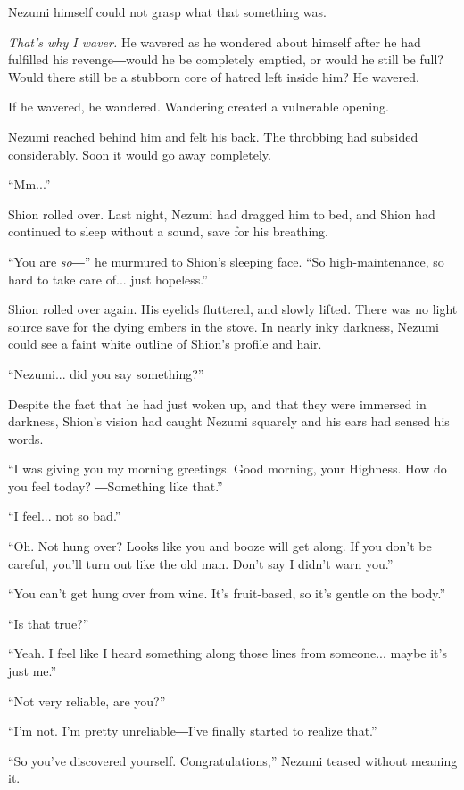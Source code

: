 Nezumi himself could not grasp what that something was.

\emph{That's why I waver.} He wavered as he wondered about himself after he had
fulfilled his revenge―would he be completely emptied, or would he still
be full? Would there still be a stubborn core of hatred left inside him?
He wavered.

If he wavered, he wandered. Wandering created a vulnerable opening.

Nezumi reached behind him and felt his back. The throbbing had subsided
considerably. Soon it would go away completely.

``Mm...''

Shion rolled over. Last night, Nezumi had dragged him to bed, and Shion
had continued to sleep without a sound, save for his breathing.

``You are \emph{so}―'' he murmured to Shion's sleeping face. ``So
high-maintenance, so hard to take care of... just hopeless.''

Shion rolled over again. His eyelids fluttered, and slowly lifted. There
was no light source save for the dying embers in the stove. In nearly
inky darkness, Nezumi could see a faint white outline of Shion's profile
and hair.

``Nezumi... did you say something?''

Despite the fact that he had just woken up, and that they were immersed
in darkness, Shion's vision had caught Nezumi squarely and his ears had
sensed his words.

``I was giving you my morning greetings. Good morning, your Highness.
How do you feel today? ―Something like that.''

``I feel... not so bad.''

``Oh. Not hung over? Looks like you and booze will get along. If you
don't be careful, you'll turn out like the old man. Don't say I didn't
warn you.''

``You can't get hung over from wine. It's fruit-based, so it's gentle on
the body.''

``Is that true?''

``Yeah. I feel like I heard something along those lines from someone...
maybe it's just me.''

``Not very reliable, are you?''

``I'm not. I'm pretty unreliable―I've finally started to realize that.''

``So you've discovered yourself. Congratulations,'' Nezumi teased
without meaning it.

